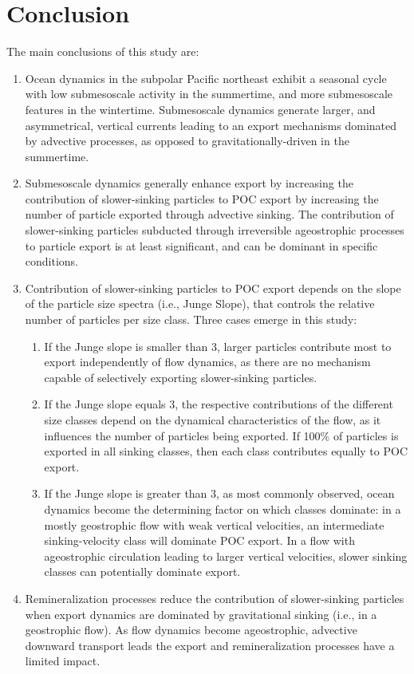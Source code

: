 \documentclass[draft,linenumbers]{agujournal2018}
\begin{document}
\section{Conclusion}
\label{sec: Conclusions}
The main conclusions of this study are: 
\begin{enumerate}
\item Ocean dynamics in the subpolar Pacific northeast exhibit a seasonal cycle with low submesoscale activity in the summertime, and more submesoscale features in the wintertime. Submesoscale dynamics generate larger, and asymmetrical, vertical currents leading to an export mechanisms dominated by advective processes, as opposed to gravitationally-driven in the summertime.

\item Submesoscale dynamics generally enhance export by increasing the contribution of slower-sinking particles to POC export by increasing the number of particle exported through advective sinking. The contribution of slower-sinking particles subducted through irreversible ageostrophic processes to particle export is at least significant, and can be dominant in specific conditions.
\item Contribution of slower-sinking particles to POC export depends on the slope of the particle size spectra (i.e., Junge Slope), that controls the relative number of particles per size class. Three cases emerge in this study:
\begin{enumerate}
	\item If the Junge slope is smaller than 3, larger particles contribute most to export independently of flow dynamics, as there are no mechanism capable of selectively exporting slower-sinking particles.
	\item If the Junge slope equals 3, the respective contributions of the different size classes depend on the dynamical characteristics of the flow, as it influences the number of particles being exported. If 100\% of particles is exported in all sinking classes, then each class contributes equally to POC export.
	\item If the Junge slope is greater than 3, as most commonly observed, ocean dynamics become the determining factor on which classes dominate: in a mostly geostrophic flow with weak vertical velocities, an intermediate sinking-velocity class will dominate POC export. In a flow with ageostrophic circulation leading to larger vertical velocities, slower sinking classes can potentially dominate export.
	\end{enumerate}
\item Remineralization processes reduce the contribution of slower-sinking particles when export dynamics are dominated by gravitational sinking (i.e., in a geostrophic flow). As flow dynamics become ageostrophic, advective downward transport leads the export and remineralization processes have a limited impact.
\end{enumerate}
\end{document}

